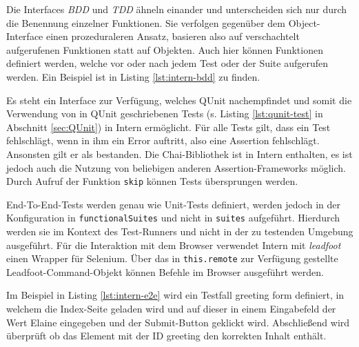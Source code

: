 Die Interfaces \textit{BDD} und \textit{TDD} ähneln einander und unterscheiden sich nur durch die Benennung einzelner Funktionen. Sie verfolgen gegenüber dem Object-Interface einen prozeduraleren Ansatz, basieren also auf verschachtelt aufgerufenen Funktionen statt auf Objekten. Auch hier können Funktionen definiert werden, welche vor oder nach jedem Test oder der Suite aufgerufen werden. Ein Beispiel ist in Listing \ref{lst:intern-bdd} zu finden.\cite{intern-userguide}

\begin{figure}[H]
	
\end{figure}

Es steht ein Interface zur Verfügung, welches QUnit nachempfindet und somit die Verwendung von in QUnit geschriebenen Tests (s. Listing \ref{lst:qunit-test} in Abschnitt \ref{sec:QUnit}) in Intern ermöglicht. Für alle Tests gilt, dass ein Test fehlschlägt, wenn in ihm ein Error auftritt, also eine Assertion fehlschlägt. Ansonsten gilt er als bestanden. Die Chai-Bibliothek ist in Intern enthalten, es ist jedoch auch die Nutzung von beliebigen anderen Assertion-Frameworks möglich. Durch Aufruf der Funktion \texttt{skip} können Tests übersprungen werden.\cite{intern-userguide}

End-To-End-Tests werden genau wie Unit-Tests definiert, werden jedoch in der Konfiguration in \texttt{functionalSuites} und nicht in \texttt{suites} aufgeführt. Hierdurch werden sie im Kontext des Test-Runners und nicht in der zu testenden Umgebung ausgeführt. Für die Interaktion mit dem Browser verwendet Intern mit \textit{leadfoot} einen Wrapper für Selenium. Über das in \texttt{this.remote} zur Verfügung gestellte Leadfoot-Command-Objekt können Befehle im Browser ausgeführt werden.\cite{intern-userguide}

\begin{figure}[H]
	
\end{figure}

Im Beispiel in Listing \ref{lst:intern-e2e} wird ein Testfall \glqq greeting form\grqq{} definiert, in welchem die Index-Seite geladen wird und auf dieser in einem Eingabefeld der Wert \glqq Elaine\grqq{} eingegeben und der Submit-Button geklickt wird. Abschließend wird überprüft ob das Element mit der ID \glqq greeting\grqq{} den korrekten Inhalt enthält.

